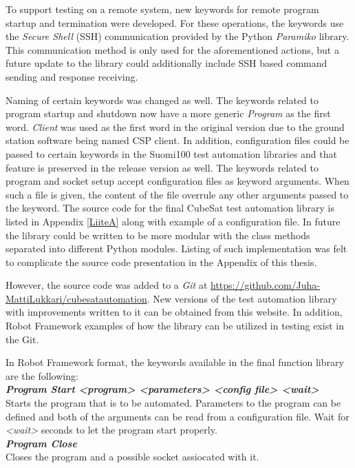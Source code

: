 \documentclass[english,12pt,a4paper,pdftex,elec,utf8]{aaltothesis}
\begin{document}
To support testing on a remote system, new keywords for remote program startup and termination were developed. For these operations, the keywords use the \textit{Secure Shell} (SSH) communication provided by the Python \textit{Paramiko} library. This communication method is only used for the aforementioned actions, but a future update to the library could additionally include SSH based command sending and response receiving. \par 
Naming of certain keywords was changed as well. The keywords related to program startup and shutdown now have a more generic \textit{Program} as the first word. \textit{Client} was used as the first word in the original version due to the ground station software being named CSP client. In addition, configuration files could be passed to certain keywords in the Suomi100 test automation libraries and that feature is preserved in the release version as well. The keywords related to program and socket setup accept configuration files as keyword arguments. When such a file is given, the content of the file overrule any other arguments passed to the keyword. The source code for the final CubeSat test automation library is listed in Appendix \ref{LiiteA} along with example of a configuration file. In future the library could be written to be more modular with the class methods separated into different Python modules. Listing of such implementation was felt to complicate the source code presentation in the Appendix of this thesis.\par
However, the source code was added to a \textit{Git} at \url{https://github.com/Juha-MattiLukkari/cubesatautomation}. New versions of the test automation library with improvements written to it can be obtained from this website. In addition, Robot Framework examples of how the library can be utilized in testing exist in the Git. \par
In Robot Framework format, the keywords available in the final function library are the following:\\
\textit{\textbf{Program Start  <program> <parameters> <config file> <wait>}}\\
Starts the program that is to be automated. Parameters to the program can be defined and both of the arguments can be read from a configuration file. Wait for \textit{<wait>} seconds to let the program start properly.\\
\textit{\textbf{Program Close}}\\
Closes the program and a possible socket assiocated with it.\\
\end{document}
